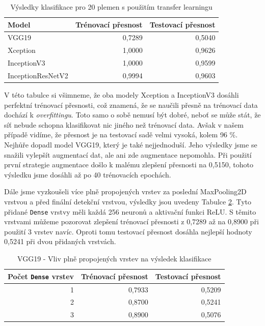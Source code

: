 \documentclass[a4paper,12pt]{article}
\begin{document}
\begin{table}[h!]
    \centering
    \begin{tabular}{l | r | r}
    \toprule
    Model               & Trénovací přesnost    & Testovací přesnost  \\\midrule
    VGG19               & 0,7289                & 0,5040              \\
    Xception            & 1,0000                & 0,9626              \\
    InceptionV3         & 1,0000                & 0,9599              \\
    InceptionResNetV2   & 0,9994                & 0,9603              \\
    \bottomrule
    \end{tabular}
    \caption{Výsledky klasifikace pro 20 plemen s použitím transfer learningu}
    \label{tab:transfered_t20_results}
\end{table}

V této tabulce si všimneme, že oba modely Xception a InceptionV3 dosáhli perfektní trénovací přesnosti, což znamená, že se naučili přesně na trénovací data dochází k \emph{overfittingu}. 
Toto samo o sobě nemusí být dobré, neboť se může stát, že síť nebude schopna klasifikovat nic jiného než trénovací data. Avšak v našem případě vidíme, že přesnost je na testovací sadě velmi vysoká, 
kolem 96 \%. Nejhůře dopadl model VGG19, který je také nejjednoduší. Jeho výsledky jsme se snažili vylepšít augmentací dat, ale ani zde augmentace nepomohla. Při použití první strategie augmentace došlo
k malému zlepšení přesnosti na 0,5150, tohoto výsledku jsme dosáhli až po 40 trénovacích epochách.

Dále jsme vyzkoušeli více plně propojených vrstev za poslední MaxPooling2D vrstvou a před finální detekční vrstvou, výsledky jsou uvedeny Tabulce \ref{tab:vgg19_dense_test}. 
Tyto přidané \texttt{Dense} vrstvy měli každá 256 neuronů a aktivační funkci ReLU. S těmito vrstvami můžeme pozorovat zlepšení trénovací přesnosti z 0,7289 až na 0,8900 při použití 3 vrstev navíc. 
Oproti tomu testovací přesnost dosáhla nejlepší hodnoty 0,5241 při dvou přidaných vrstvách. 

\begin{table}[h!]
    \centering
    \begin{tabular}{r | r | r}
    \toprule
    Počet \texttt{Dense} vrstev & Trénovací přesnost    & Testovací přesnost  \\\midrule
    1                           & 0,7933                & 0,5209              \\
    2                           & 0,8700                & 0,5241              \\
    3                           & 0,8900                & 0,5076              \\
    \bottomrule
    \end{tabular}
    \caption{VGG19 - Vliv plně propojených vrstev na výsledek klasifikace}
    \label{tab:vgg19_dense_test}
\end{table}
\end{document}
